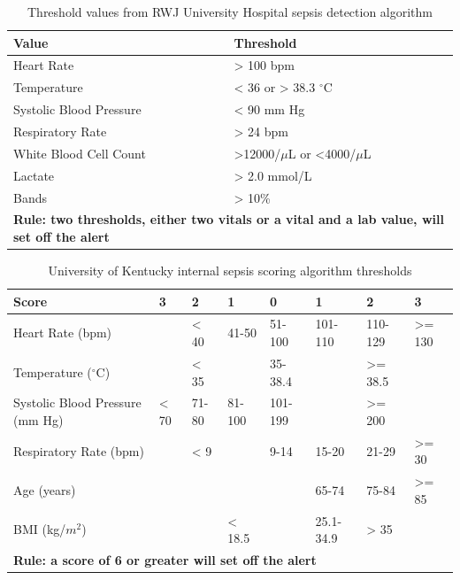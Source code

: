 \documentclass{sig-alternate}
\begin{document}
\begin{table}
\renewcommand{\arraystretch}{1.5}
  \begin{tabular}{| l | l |}
\hline

{\bf Value} & {\bf Threshold}\\ \hline
Heart Rate & > 100 bpm\\ \hline
Temperature & < 36 or > 38.3 $^\circ$C\\ \hline
Systolic Blood Pressure & < 90 mm Hg\\ \hline
Respiratory Rate & > 24 bpm\\ \hline \hline
White Blood Cell Count & >12000/$\mu$L  or <4000/$\mu$L\\ \hline
Lactate & > 2.0 mmol/L\\ \hline
Bands & > 10\% \\ \hline
 \multicolumn{2}{|p{7cm}|}{\bf Rule: two thresholds, either two vitals or a vital and a lab value, will set off the alert} \\ \hline

 \end{tabular}
	\caption{Threshold values from RWJ University Hospital sepsis detection algorithm}
  \label{tab:rwj_table}
\end{table}

\begin{table}
\begin{center}
\renewcommand{\arraystretch}{1.5}
  \begin{tabular}{| l | l | l | l | l | l | l | l |}
\hline

{\bf Score} & {\bf 3} & {\bf 2} & {\bf 1} & {\bf 0} & {\bf 1} & {\bf 2} & {\bf 3}\\ \hline
Heart Rate (bpm) & & < 40 & 41-50 & 51-100 & 101-110 & 110-129 & >= 130\\ \hline
Temperature ($^\circ$C) & & < 35 & & 35-38.4 & & >= 38.5 &\\ \hline
Systolic Blood Pressure (mm Hg) & < 70 & 71-80 & 81-100 & 101-199 & & >= 200 & \\ \hline
Respiratory Rate (bpm) & & < 9 & & 9-14 & 15-20 & 21-29 & >= 30\\ \hline
Age (years) & & & & & 65-74 & 75-84 & >= 85\\ \hline
BMI (kg/$m^2$) & & & < 18.5 & & 25.1-34.9 & > 35 & \\ \hline
 \multicolumn{8}{|l|}{\bf Rule: a score of 6 or greater will set off the alert} \\ \hline
 \end{tabular}
	\caption{University of Kentucky internal sepsis scoring algorithm thresholds}
  \label{tab:uk_table}
\end{center}
\end{table}
\end{document}
